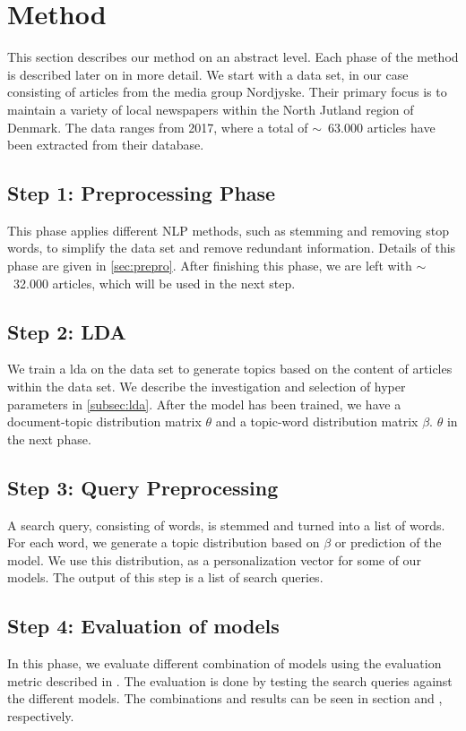 \section{Method}\label{sec:method}
This section describes our method on an abstract level.
Each phase of the method is described later on in more detail. 
We start with a data set, in our case consisting of articles from the media group Nordjyske. 
Their primary focus is to maintain a variety of local newspapers within the North Jutland region of Denmark. 
The data ranges from 2017, where a total of $\sim$~63.000 articles have been extracted from their database.

\subsection*{Step 1: Preprocessing Phase}
This phase applies different \gls{NLP} methods, such as stemming and removing stop words, to simplify the data set and remove redundant information.
Details of this phase are given in \autoref{sec:prepro}.
After finishing this phase, we are left with $\sim$~32.000 articles, which will be used in the next step.

\subsection*{Step 2: LDA}
We train a \acrfull{lda} on the data set to generate topics based on the content of articles within the data set. 
We describe the investigation and selection of hyper parameters in \autoref{subsec:lda}. 
After the model has been trained, we have a document-topic distribution matrix $\theta$ and a topic-word distribution matrix $\beta$.
$\theta$ in the next phase.

\subsection*{Step 3: Query Preprocessing}
A search query, consisting of words, is stemmed and turned into a list of words.
For each word, we generate a topic distribution based on $\beta$ or prediction of the model.
We use this distribution, as a personalization vector for some of our models.
The output of this step is a list of search queries.


\subsection*{Step 4: Evaluation of models}
In this phase, we evaluate different combination of models using the evaluation metric described in .
The evaluation is done by testing the search queries against the different models. 
The combinations and results can be seen in section  and , respectively.



